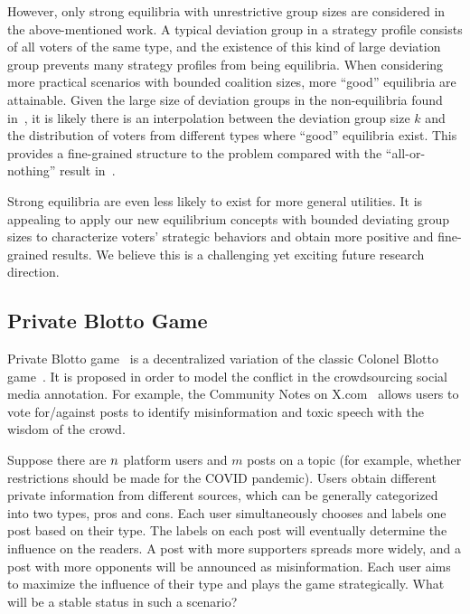 However, only strong equilibria with unrestrictive group sizes are considered in the above-mentioned work.
A typical deviation group in a strategy profile consists of all voters of the same type, and the existence of this kind of large deviation group prevents many strategy profiles from being equilibria.
When considering more practical scenarios with bounded coalition sizes, more ``good'' equilibria are attainable.
Given the large size of deviation groups in the non-equilibria found in~\citet{deng2024aggregation}, it is likely there is an interpolation between the deviation group size $k$ and the distribution of voters from different types where ``good'' equilibria exist.
This provides a fine-grained structure to the problem compared with the ``all-or-nothing'' result in~\citet{deng2024aggregation}.

Strong equilibria are even less likely to exist for more general utilities.
It is appealing to apply our new equilibrium concepts with bounded deviating group sizes to characterize voters' strategic behaviors and obtain more positive and fine-grained results.
We believe this is a challenging yet exciting future research direction.

\subsection{Private Blotto Game}
Private Blotto game~\citep{donahue2023private} is a decentralized variation of the classic Colonel Blotto game~\citep{Borel1953:Blotto}.
It is proposed in order to model the conflict in the crowdsourcing social media annotation. For example, the Community Notes on X.com~\citep{wojcik2022birdwatch} allows users to vote for/against posts to identify misinformation and toxic speech with the wisdom of the crowd. 
\begin{example}
    \label{ex:anno} Suppose there are $n$ platform users and $m$ posts on a topic (for example, whether restrictions should be made for the COVID pandemic). Users obtain different private information from different sources, which can be generally categorized into two types, pros and cons. Each user simultaneously chooses and labels one post based on their type. The labels on each post will eventually determine the influence on the readers. A post with more supporters spreads more widely, and a post with more opponents will be announced as misinformation. Each user aims to maximize the influence of their type and plays the game strategically. What will be a stable status in such a scenario?
\end{example}

